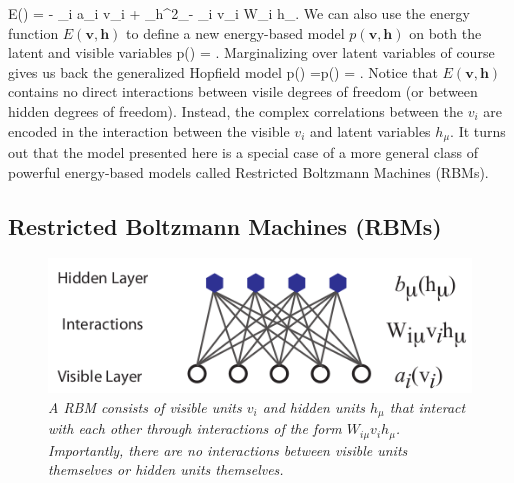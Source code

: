 \be 
E() = - \sum_i a_i v_i + \half \sum_\mu h^2_\mu - \sum_{i\mu} v_i W_{i\mu} h_\mu. 
\ee 
We can also use the energy function $E(\mathbf{v,h})$ to define a new energy-based model $p(\mathbf{v,h})$ on both the latent and visible variables
\be 
p() = .
\ee 
Marginalizing over latent variables of course gives us back the generalized Hopfield model
\be 
p() =\int \md {}p() = .
\ee 
Notice that $E(\mathbf{v,h})$ contains no direct interactions between visile degrees of freedom (or between hidden degrees of freedom). Instead, the complex correlations between the $v_i$ are encoded in the interaction between the visible $v_i$ and latent variables $h_\mu$. It turns out that the model presented here is a special case of a more general class of powerful energy-based models called Restricted Boltzmann Machines (RBMs).


\subsection{Restricted Boltzmann Machines (RBMs)}
\label{sec:deepGenerativeRBM}


\begin{figure}[h!]
	\centering
	\includegraphics[width=0.5\linewidth]{gfx/RBM}
	\caption{\itshape A RBM consists of visible units $v_i$ and hidden units $h_\mu$ that interact with each other through interactions of the form $W_{i\mu}v_ih_\mu$. Importantly, there are no interactions between visible units themselves or hidden units themselves.}
	\label{fig:RBM}
\end{figure}

